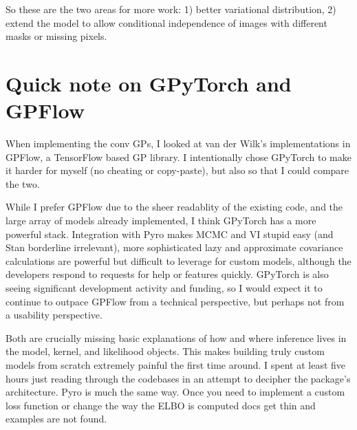 \documentclass{article}
\begin{document}
So these are the two areas for more work: 1) better variational distribution,
2) extend the model to allow conditional independence of images with different
masks or missing pixels.

\section{Quick note on GPyTorch and GPFlow}
When implementing the conv GPs, I looked at van der Wilk's implementations in
GPFlow, a TensorFlow based GP library. I intentionally chose GPyTorch to make
it harder for myself (no cheating or copy-paste), but also so that I could compare the two.

While I prefer GPFlow due to the sheer readablity of the
existing code, and the large array of models already implemented, I think GPyTorch
has a more powerful stack. Integration with Pyro makes MCMC and VI stupid easy (and Stan borderline irrelevant), more sophisticated lazy and approximate covariance calculations are powerful but difficult to leverage for custom models, although the developers respond to requests for help or features quickly.
GPyTorch is also seeing significant development activity and funding, so I would expect
it to continue to outpace GPFlow from a technical perspective, but perhaps not from
a usability perspective.

Both are crucially missing basic explanations of how and where inference lives in
the model, kernel, and likelihood objects. This makes building truly custom models from scratch
extremely painful the first time around. I spent at least five hours just reading
through the codebases in an attempt to decipher the package's architecture.
Pyro is much the same way. Once you need to implement a custom loss function or
change the way the ELBO is computed docs get thin and examples are not found.

\nocite{*}


\end{document}
